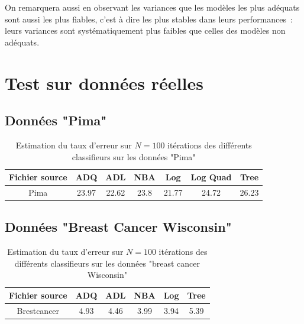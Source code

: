 \documentclass[a4paper,10pt]{report}
\begin{document}
On remarquera aussi en observant les variances que les modèles les plus adéquats sont aussi les plus fiables, c'est à dire les plus stables dans leurs performances~: leurs variances sont systématiquement plus faibles que celles des modèles non adéquats.

\section{Test sur données réelles}


\subsection{Données "Pima"}

\begin{table}[H]
	\centering
	\captionsetup{justification=centering, margin=4cm}
	\begin{tabular}{c|c|c|c|c|c|c}
		Fichier source & ADQ & ADL & NBA & Log & Log Quad & Tree \\ 
		\hline
		Pima & 23.97 & 22.62 & 23.8 & 21.77 & 24.72 & 26.23  \\ 
	\end{tabular}
	\caption{\small Estimation du taux d'erreur sur $N=100$ itérations des différents classifieurs sur les données "Pima"}
	\label{table:2-1-erreur-data-pima}
\end{table}

\subsection{Données "Breast Cancer Wisconsin"}

\begin{table}[H]
	\centering
	\captionsetup{justification=centering, margin=4cm}
	\begin{tabular}{c|c|c|c|c|c}
		Fichier source & ADQ & ADL & NBA & Log & Tree \\ 
		\hline
		Brestcancer & 4.93 & 4.46 & 3.99 & 3.94 & 5.39 \\ 
	\end{tabular}
	\caption{\small Estimation du taux d'erreur sur $N=100$ itérations des différents classifieurs sur les données "breast cancer Wisconsin"}
	\label{table:2-1-erreur-data-breastcancer}
\end{table}
\end{document}
